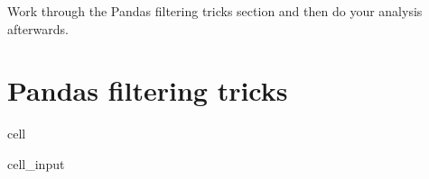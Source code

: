 \documentclass[letterpaper,10pt,english]{jupyterBook}
\begin{document}
\sphinxAtStartPar
Work through the Pandas filtering tricks section and then do your analysis afterwards.


\section{Pandas filtering tricks}
\label{\detokenize{lessons/Running_Time_Analysis:pandas-filtering-tricks}}
\begin{sphinxuseclass}{cell}\begin{sphinxVerbatimInput}

\begin{sphinxuseclass}{cell_input}
\begin{sphinxVerbatim}[commandchars=\\\{\}]
   
   
\end{sphinxVerbatim}

\end{sphinxuseclass}\end{sphinxVerbatimInput}

\end{sphinxuseclass}
\end{document}
